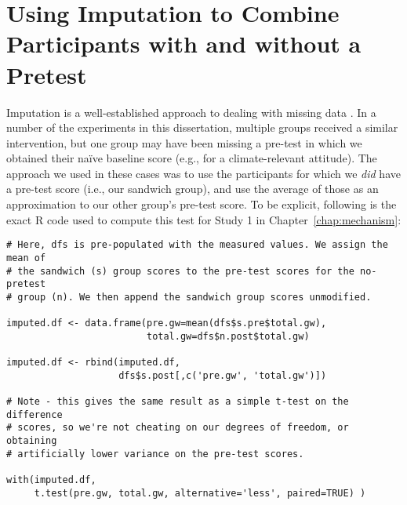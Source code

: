 \chapter{Using Imputation to Combine Participants with and without a Pretest}
\label{app:imputation}

Imputation is a well-established approach to dealing with missing data
\parencite[for an overview see][Chapter 20]{fox_applied_2008}. In a number of
the experiments in this dissertation, multiple groups received a similar
intervention, but one group may have been missing a pre-test in which we obtained
their na\"ive baseline score (e.g., for a climate-relevant attitude). The
approach we used in these cases was to use the participants for which we
\emph{did} have a pre-test score (i.e., our sandwich group), and use the average
of those as an approximation to our other group's pre-test score. To be explicit,
following is the exact R code used to compute this test for Study 1 in
Chapter~\ref{chap:mechanism}:

\begin{verbatim}
# Here, dfs is pre-populated with the measured values. We assign the mean of
# the sandwich (s) group scores to the pre-test scores for the no-pretest
# group (n). We then append the sandwich group scores unmodified.

imputed.df <- data.frame(pre.gw=mean(dfs$s.pre$total.gw),
                         total.gw=dfs$n.post$total.gw)

imputed.df <- rbind(imputed.df,
                    dfs$s.post[,c('pre.gw', 'total.gw')])

# Note - this gives the same result as a simple t-test on the difference
# scores, so we're not cheating on our degrees of freedom, or obtaining
# artificially lower variance on the pre-test scores.

with(imputed.df,
     t.test(pre.gw, total.gw, alternative='less', paired=TRUE) )
\end{verbatim}
